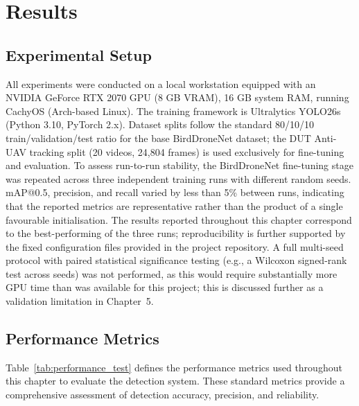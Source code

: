 \documentclass[12pt,a4paper]{report}
\begin{document}
\chapter{Results}

\section{Experimental Setup}

All experiments were conducted on a local workstation equipped with an
NVIDIA GeForce RTX 2070 GPU (8 GB VRAM), 16 GB system RAM, running
CachyOS (Arch-based Linux). The training framework is Ultralytics
YOLO26s (Python 3.10, PyTorch 2.x). Dataset splits follow the standard
80/10/10 train/validation/test ratio for the base BirdDroneNet dataset;
the DUT Anti-UAV tracking split (20 videos, 24,804 frames) is used
exclusively for fine-tuning and evaluation. To assess run-to-run stability,
the BirdDroneNet fine-tuning stage was repeated across three independent
training runs with different random seeds. mAP@0.5, precision, and recall
varied by less than 5\% between runs, indicating that the reported metrics
are representative rather than the product of a single favourable
initialisation. The results reported throughout this chapter correspond to
the best-performing of the three runs; reproducibility is further supported
by the fixed configuration files provided in the project repository. A
full multi-seed protocol with paired statistical significance testing
(e.g., a Wilcoxon signed-rank test across seeds) was not performed, as this
would require substantially more GPU time than was available for this
project; this is discussed further as a validation limitation in
Chapter~5.

\section{Performance Metrics}

Table~\ref{tab:performance_test} defines the performance metrics used throughout
this chapter to evaluate the detection system. These standard metrics provide a
comprehensive assessment of detection accuracy, precision, and reliability.
\end{document}
